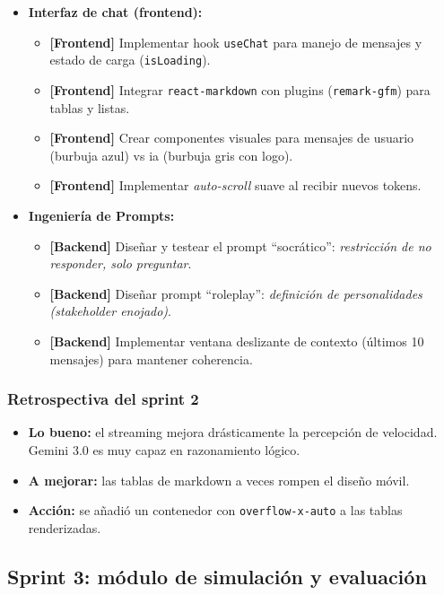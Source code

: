\begin{itemize}
\item \textbf{Interfaz de chat (frontend):}
\begin{itemize}
\item \textbf{[Frontend]} Implementar hook \texttt{useChat} para manejo de mensajes y estado de carga (\texttt{isLoading}).
\item \textbf{[Frontend]} Integrar \texttt{react-markdown} con plugins (\texttt{remark-gfm}) para tablas y listas.
\item \textbf{[Frontend]} Crear componentes visuales para mensajes de usuario (burbuja azul) vs \gls{ia} (burbuja gris con logo).
\item \textbf{[Frontend]} Implementar \textit{auto-scroll} suave al recibir nuevos tokens.
\end{itemize}
\end{itemize}

\begin{itemize}
\item \textbf{Ingeniería de Prompts:}
\begin{itemize}
\item \textbf{[Backend]} Diseñar y testear el prompt \enquote{socrático}: \textit{restricción de no responder, solo preguntar}.
\item \textbf{[Backend]} Diseñar prompt \enquote{roleplay}: \textit{definición de personalidades (stakeholder enojado)}.
\item \textbf{[Backend]} Implementar ventana deslizante de contexto (últimos 10 mensajes) para mantener coherencia.
\end{itemize}
\end{itemize}

\subsubsection{Retrospectiva del sprint 2}
\begin{itemize}
\item \textbf{Lo bueno:} el streaming mejora drásticamente la percepción de velocidad. Gemini 3.0 es muy capaz en razonamiento lógico.
\item \textbf{A mejorar:} las tablas de markdown a veces rompen el diseño móvil.
\item \textbf{Acción:} se añadió un contenedor con \texttt{overflow-x-auto} a las tablas renderizadas.
\end{itemize}

\subsection{Sprint 3: módulo de simulación y evaluación}

